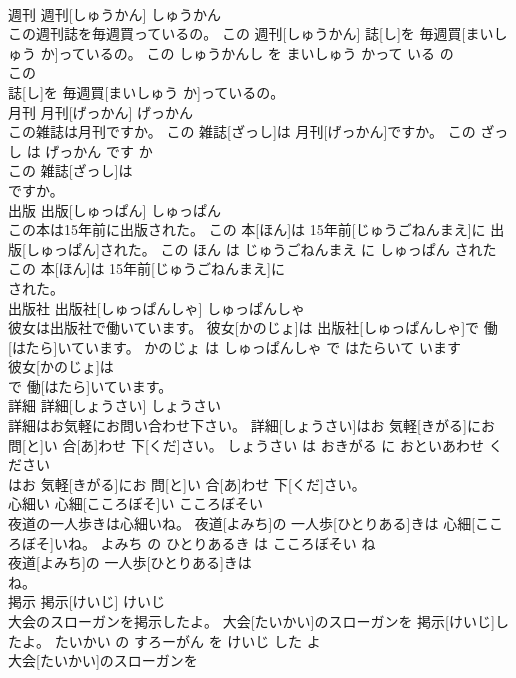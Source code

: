 \documentclass[8pt]{extreport}
\begin{document}
\begin{CJK}{UTF8}{min}
\\	週刊	週刊[しゅうかん]	しゅうかん	
\\	この週刊誌を毎週買っているの。	この 週刊[しゅうかん] 誌[し]を 毎週買[まいしゅう か]っているの。	この しゅうかんし を まいしゅう かって いる の	
\\	この
\\	誌[し]を 毎週買[まいしゅう か]っているの。			
\\	月刊	月刊[げっかん]	げっかん	
\\	この雑誌は月刊ですか。	この 雑誌[ざっし]は 月刊[げっかん]ですか。	この ざっし は げっかん です か	
\\	この 雑誌[ざっし]は
\\	ですか。			
\\	出版	出版[しゅっぱん]	しゅっぱん	
\\	この本は15年前に出版された。	この 本[ほん]は 15年前[じゅうごねんまえ]に 出版[しゅっぱん]された。	この ほん は じゅうごねんまえ に しゅっぱん された	
\\	この 本[ほん]は 15年前[じゅうごねんまえ]に
\\	された。			
\\	出版社	出版社[しゅっぱんしゃ]	しゅっぱんしゃ	
\\	彼女は出版社で働いています。	彼女[かのじょ]は 出版社[しゅっぱんしゃ]で 働[はたら]いています。	かのじょ は しゅっぱんしゃ で はたらいて います	
\\	彼女[かのじょ]は
\\	で 働[はたら]いています。			
\\	詳細	詳細[しょうさい]	しょうさい	
\\	詳細はお気軽にお問い合わせ下さい。	詳細[しょうさい]はお 気軽[きがる]にお 問[と]い 合[あ]わせ 下[くだ]さい。	しょうさい は おきがる に おといあわせ ください	
\\	はお 気軽[きがる]にお 問[と]い 合[あ]わせ 下[くだ]さい。			
\\	心細い	心細[こころぼそ]い	こころぼそい	
\\	夜道の一人歩きは心細いね。	夜道[よみち]の 一人歩[ひとりある]きは 心細[こころぼそ]いね。	よみち の ひとりあるき は こころぼそい ね	
\\	夜道[よみち]の 一人歩[ひとりある]きは
\\	ね。			
\\	掲示	掲示[けいじ]	けいじ	
\\	大会のスローガンを掲示したよ。	大会[たいかい]のスローガンを 掲示[けいじ]したよ。	たいかい の すろーがん を けいじ した よ	
\\	大会[たいかい]のスローガンを

\end{CJK}
\end{document}
